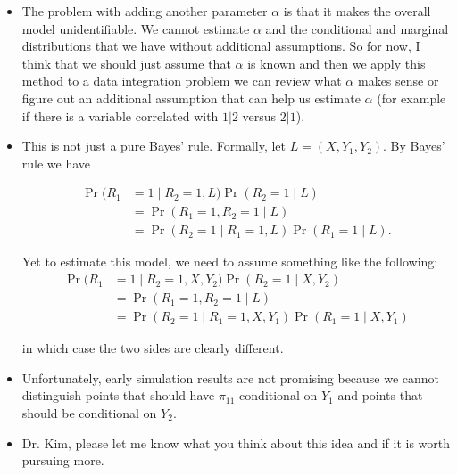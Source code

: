 \begin{itemize}
  \item The problem with adding another parameter $\alpha$ is that it makes the
    overall model unidentifiable. We cannot estimate $\alpha$ and the
    conditional and marginal distributions that we have without additional
    assumptions. So for now, I think that we should just assume that $\alpha$ is
    known and then we apply this method to a data integration problem we can
    review what $\alpha$ makes sense or figure out an additional assumption that
    can help us estimate $\alpha$ (for example if there is a variable correlated
    with $1|2$ versus $2|1$).

  \item This is not just a pure Bayes' rule.
    Formally, let $L = (X, Y_1, Y_2)$. By Bayes' rule we have

    \begin{align*}
      \Pr(R_1 &= 1 \mid R_2 = 1, L) \Pr(R_2 = 1 \mid L) \\
      &= \Pr(R_1 = 1, R_2 = 1 \mid L) \\
      & = \Pr(R_2 = 1 \mid R_1 = 1, L) \Pr(R_1 = 1 \mid L).
    \end{align*}

    Yet to estimate this model, we need to assume something like the following:
    \begin{align*}
      \Pr(R_1 &= 1 \mid R_2 = 1, X, Y_2) \Pr(R_2 = 1 \mid X, Y_2)\\
      &= \Pr(R_1 = 1, R_2 = 1 \mid L) \\
      &= \Pr(R_2 = 1 \mid R_1 = 1, X, Y_1) \Pr(R_1 = 1 \mid X, Y_1)
    \end{align*}

    in which case the two sides are clearly different.

    \item Unfortunately, early simulation results are not promising because we
      cannot distinguish points that should have $\pi_{11}$ conditional on $Y_1$
      and points that should be conditional on $Y_2$.

      

    \item Dr. Kim, please let me know what you think about this idea and if it
      is worth pursuing more.

\end{itemize}
